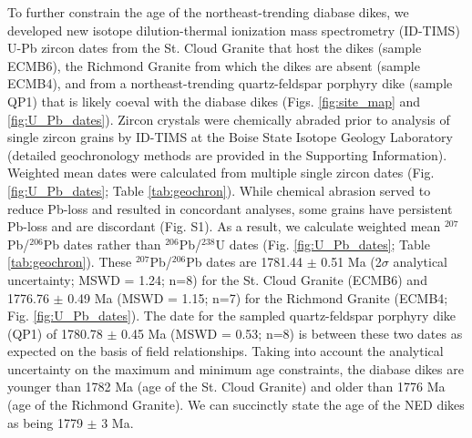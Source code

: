 \documentclass[draft]{agujournal2019}
\begin{document}
To further constrain the age of the northeast-trending diabase dikes, we developed new isotope dilution-thermal ionization mass spectrometry (ID-TIMS) U-Pb zircon dates from the St. Cloud Granite that host the dikes (sample ECMB6), the Richmond Granite from which the dikes are absent (sample ECMB4), and from a northeast-trending quartz-feldspar porphyry dike (sample QP1) that is likely coeval with the diabase dikes (Figs. \ref{fig:site_map} and \ref{fig:U_Pb_dates}). Zircon crystals were chemically abraded prior to analysis of single zircon grains by ID-TIMS at the Boise State Isotope Geology Laboratory (detailed geochronology methods are provided in the Supporting Information). Weighted mean dates were calculated from multiple single zircon dates (Fig. \ref{fig:U_Pb_dates}; Table \ref{tab:geochron}). While chemical abrasion served to reduce Pb-loss and resulted in concordant analyses, some grains have persistent Pb-loss and are discordant (Fig. S1). As a result, we calculate weighted mean  $^{207}$Pb/$^{206}$Pb dates rather than $^{206}$Pb/$^{238}$U dates (Fig. \ref{fig:U_Pb_dates}; Table \ref{tab:geochron}). These $^{207}$Pb/$^{206}$Pb dates are 1781.44 $\pm$ 0.51 Ma (2$\sigma$ analytical uncertainty; MSWD = 1.24; n=8) for the St. Cloud Granite (ECMB6) and 1776.76 $\pm$ 0.49 Ma (MSWD = 1.15; n=7) for the Richmond Granite (ECMB4; Fig. \ref{fig:U_Pb_dates}). The date for the sampled quartz-feldspar porphyry dike (QP1) of 1780.78 $\pm$ 0.45 Ma (MSWD = 0.53; n=8) is between these two dates as expected on the basis of field relationships. Taking into account the analytical uncertainty on the maximum and minimum age constraints, the diabase dikes are younger than 1782 Ma (age of the St. Cloud Granite) and older than 1776 Ma (age of the Richmond Granite). We can succinctly state the age of the NED dikes as being 1779 $\pm$ 3 Ma. 
\end{document}
